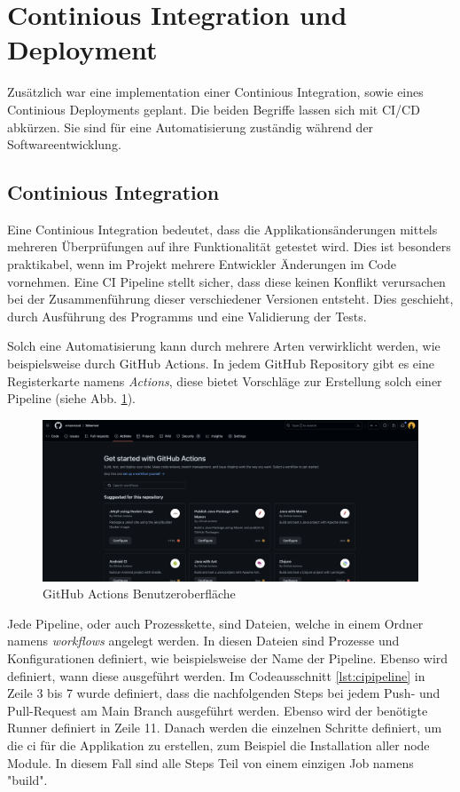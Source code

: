 \section{Continious Integration und Deployment}

Zusätzlich war eine implementation einer Continious Integration, sowie eines Continious Deployments geplant. 
Die beiden Begriffe lassen sich mit CI/CD abkürzen.
Sie sind für eine Automatisierung zuständig während der Softwareentwicklung. 

\subsection{Continious Integration}

Eine Continious Integration bedeutet, dass die Applikationsänderungen mittels mehreren Überprüfungen auf ihre Funktionalität getestet wird.
Dies ist besonders praktikabel, wenn im Projekt mehrere Entwickler Änderungen im Code vornehmen. 
Eine CI Pipeline stellt sicher, dass diese keinen Konflikt verursachen bei der Zusammenführung dieser verschiedener Versionen entsteht. 
Dies geschieht, durch Ausführung des Programms und eine Validierung der Tests. 
\cite{cicdabout}

Solch eine Automatisierung kann durch mehrere Arten verwirklicht werden, wie beispielsweise durch GitHub Actions. 
In jedem GitHub Repository gibt es eine Registerkarte namens \emph{Actions}, diese bietet Vorschläge zur Erstellung solch einer Pipeline (siehe Abb. \ref{fig:implementation:ghactions}). 

\begin{figure}
    \centering
    \includegraphics[scale=0.25]{pics/githubactions.png}
    \caption{GitHub Actions Benutzeroberfläche}
    \label{fig:implementation:ghactions}
\end{figure}

Jede Pipeline, oder auch Prozesskette, sind Dateien, welche in einem Ordner namens \emph{workflows} angelegt werden. 
In diesen Dateien sind Prozesse und Konfigurationen definiert, wie beispielsweise der Name der Pipeline.
Ebenso wird definiert, wann diese ausgeführt werden. 
Im Codeausschnitt \ref{lst:cipipeline} in Zeile 3 bis 7 wurde definiert, dass die nachfolgenden Steps bei jedem Push- und Pull-Request am Main Branch ausgeführt werden. 
Ebenso wird der benötigte Runner definiert in Zeile 11. 
Danach werden die einzelnen Schritte definiert, um die \gls{ci} für die Applikation zu erstellen, zum Beispiel die Installation aller node Module. 
In diesem Fall sind alle Steps Teil von einem einzigen Job namens "build". 


